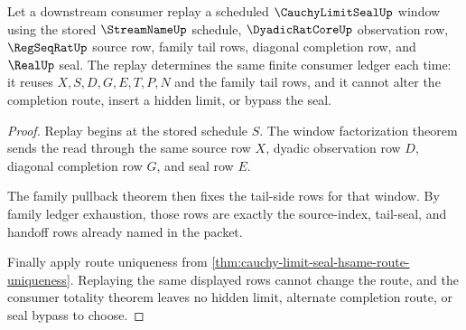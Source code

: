 \begin{theorem}
\label{thm:cauchy-limit-seal-window-replay-determinacy}
Let a downstream consumer replay a scheduled $\CauchyLimitSealUp$ window using the stored $\StreamNameUp$ schedule, $\DyadicRatCoreUp$ observation row, $\RegSeqRatUp$ source row, family tail rows, diagonal completion row, and $\RealUp$ seal. The replay determines the same finite consumer ledger each time: it reuses $X,S,D,G,E,T,P,N$ and the family tail rows, and it cannot alter the completion route, insert a hidden limit, or bypass the seal.
\end{theorem}
\begin{proof}
Replay begins at the stored schedule $S$. The window factorization theorem sends the read through the same source row $X$, dyadic observation row $D$, diagonal completion row $G$, and seal row $E$.

The family pullback theorem then fixes the tail-side rows for that window. By family ledger exhaustion, those rows are exactly the source-index, tail-seal, and handoff rows already named in the packet.

Finally apply route uniqueness from \autoref{thm:cauchy-limit-seal-hsame-route-uniqueness}. Replaying the same displayed rows cannot change the route, and the consumer totality theorem leaves no hidden limit, alternate completion route, or seal bypass to choose.
\end{proof}

